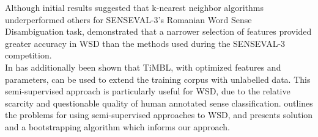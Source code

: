 \documentclass{article}
\begin{document}
Although initial results \cite{mihalcea2004evaluation} suggested that k-nearest neighbor algorithms underperformed others for SENSEVAL-3's Romanian Word Sense Disambiguation task,  demonstrated that a narrower selection of features provided greater accuracy in WSD than the methods used during the SENSEVAL-3 competition. \\

In has additionally been shown that TiMBL, with optimized features and parameters, can be used to extend the training corpus with unlabelled data. \cite{kubler2009semi}  This semi-supervised approach is particularly useful for WSD, due to the relative scarcity and questionable quality of human annotated sense classification.   outlines the problems for using semi-supervised approaches to WSD, and presents solution and a bootstrapping algorithm which informs our approach.



\end{document}
